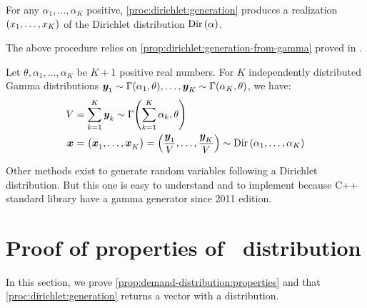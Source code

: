 \begin{prop}
For any $\alpha_1,\ldots,\alpha_K$ positive, \cref{proc:dirichlet:generation} produces a realization $\bracket{x_1,\ldots,x_K}$ of the Dirichlet distribution $\Dir\bracket{\alpha}$.
\end{prop}


The above procedure relies on \cref{prop:dirichlet:generation-from-gamma} proved in \citet{Devroye1986}.

\begin{prop}\label{prop:dirichlet:generation-from-gamma}
Let $\theta,\alpha_1,\ldots,\alpha_K$ be $K+1$ positive real numbers.
For $K$ independently distributed Gamma distributions
$\va y_1\sim\Gamma\bracket{\alpha_1,\theta},\ldots,\va y_K\sim\Gamma\bracket{\alpha_K,\theta}$,
we have:
\begin{subequations}
  \begin{align}
    V &= \sum_{k=1}^K \va y_k \sim \Gamma\bracket{\sum_{k=1}^K \alpha_k,\theta}
    \\
    \va x &= \bracket{\va x_1,\ldots,\va x_K} = \bracket{\frac{\va y_1}{V},\ldots,\frac{\va y_K}{V}} \sim \Dir\bracket{\alpha_1,\ldots,\alpha_K}
  \end{align}
\end{subequations}
\end{prop}

Other methods exist to generate random variables following a Dirichlet distribution.
But this one is easy to understand and to implement because C++ standard library have a gamma generator since 2011 edition.




\section{Proof of properties of \distrib\ distribution}
\label{sec:PDP:numerical-experiments:instances:proofs}


In this section, we prove \cref{prop:demand-distribution:properties} and that \cref{proc:dirichlet:generation} returns a vector with a \distrib distribution.


